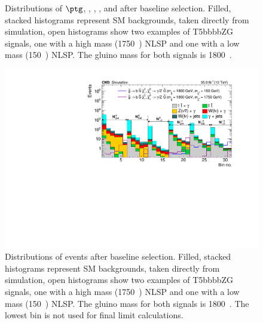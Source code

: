 \begin{figure}[htbp!]
  \captionsetup{width=.9\linewidth}
  \caption{ Distributions of $\ptg$, \ptmiss, \nj, \nb, and \htg after baseline selection.  Filled, stacked histograms represent SM backgrounds, taken directly from simulation, open histograms show two examples of T5bbbbZG signals, one with a high mass (1750~\gev) NLSP and one with a 
  low mass (150~\gev) NLSP.  The gluino mass for both signals is 1800~\gev.}
  \label{fig:baselineKineHist}
\end{figure}

\begin{figure}[h!]
  \centering
  \includegraphics[width=0.98\linewidth]{../Figures/Chap3/event-selection/SMbackgroundVersusSignalRegion.pdf}
  \captionsetup{width=.9\linewidth}
  \caption{ Distributions of events after baseline selection.  Filled, stacked histograms represent SM backgrounds, taken directly from simulation,
  open histograms show two examples of T5bbbbZG signals, one with a high mass (1750~\gev) NLSP and one with a 
  low mass (150~\gev) NLSP.  The gluino mass for both signals is 1800~\gev. The lowest \ptmiss bin is not used for 
  final limit calculations.}
  \label{fig:baselineEvtYield}
\end{figure}

